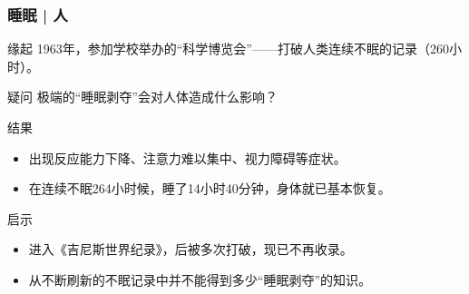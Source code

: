 \begin{frame}
  \frametitle{睡眠 | 人}
  \begin{block}{缘起}
    1963年，参加学校举办的“科学博览会”——打破人类连续不眠的记录（260小时）。
  \end{block}
  \pause
  \begin{block}{疑问}
    极端的“睡眠剥夺”会对人体造成什么影响？
  \end{block}
  \pause
  \begin{block}{结果}
    \begin{itemize}
      \item 出现反应能力下降、注意力难以集中、视力障碍等症状。
      \item 在连续不眠264小时候，睡了14小时40分钟，身体就已基本恢复。
    \end{itemize}
  \end{block}
  \pause
  \begin{block}{启示}
    \begin{itemize}
      \item 进入《吉尼斯世界纪录》，后被多次打破，现已不再收录。
      \item 从不断刷新的不眠记录中并不能得到多少“睡眠剥夺”的知识。
    \end{itemize}
  \end{block}
\end{frame}

